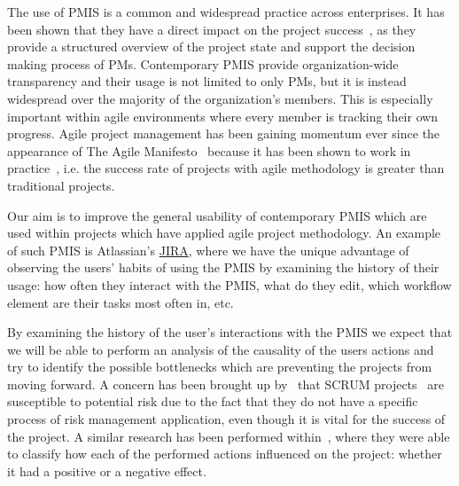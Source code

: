 \documentclass[a4paper, 12pt]{article}
\begin{document}


The use of PMIS is a common and widespread practice across enterprises. It has been shown that they have a direct impact on the project success~\cite{RAYMOND2008213}, as they provide a structured overview of the project state and support the decision making process of PMs. Contemporary PMIS provide organization-wide transparency and their usage is not limited to only PMs, but it is instead widespread over the majority of the organization's members. This is especially important within agile environments where every member is tracking their own progress. Agile project management has been gaining momentum ever since the appearance of The Agile Manifesto~\cite{alliance2001agile} because it has been shown to work in practice~\cite{SERRADOR20151040}, i.e. the success rate of projects with agile methodology is greater than traditional projects. 

Our aim is to improve the general usability of contemporary PMIS which are used within projects which have applied agile project methodology. An example of such PMIS is Atlassian's  \href{https://www.atlassian.com/software/jira}{JIRA}, where we have the unique advantage of observing the users' habits of using the PMIS by examining the history of their usage: how often they interact with the PMIS, what do they edit, which workflow element are their tasks most often in, etc.

By examining the history of the user's interactions with the PMIS we expect that we will be able to perform an analysis of the causality of the users actions and try to identify the possible bottlenecks which are preventing the projects from moving forward. A concern has been brought up by~\cite{tavares2019risk} that SCRUM projects~\cite{sutherland2013scrum} are susceptible to potential risk due to the fact that they do not have a specific process of risk management application, even though it is vital for the success of the project. A similar research has been performed within~\cite{Toole2006APM}, where they were able to classify how each of the performed actions influenced on the project: whether it had a positive or a negative effect.
\end{document}
